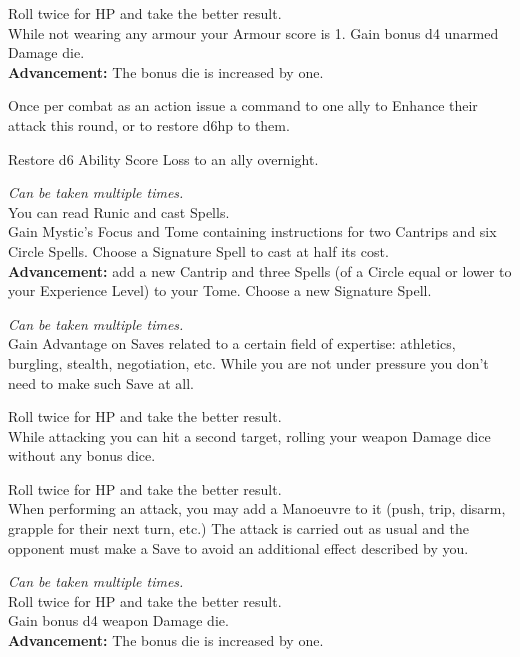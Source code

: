\documentclass[itdr]{subfiles}
\begin{document}
 Roll twice for HP and take the better result.\\
While not wearing any armour your Armour score is 1. Gain bonus d4 unarmed Damage die.\\
\textbf{Advancement:} The bonus die is increased by one.

Once per combat as an action issue a command to one ally to Enhance their attack this round, or to restore d6hp to them.

Restore d6 Ability Score Loss to an ally overnight.

 {\slshape Can be taken multiple times.}\\
You can read Runic and cast Spells.\\
Gain Mystic's Focus and Tome containing instructions for two Cantrips and six  Circle Spells. Choose a Signature Spell to cast at half its cost.\\
\textbf{Advancement:} add a new Cantrip and three Spells (of a Circle equal or lower to your Experience Level) to your Tome. Choose a new Signature Spell.

 {\slshape Can be taken multiple times.}\\
Gain Advantage on Saves related to a certain field of expertise: athletics, burgling, stealth, negotiation, etc. While you are not under pressure you don't need to make such Save at all.

 Roll twice for HP and take the better result.\\
While attacking you can hit a second target, rolling your weapon Damage dice without any bonus dice.

 Roll twice for HP and take the better result.\\
When performing an attack, you may add a Manoeuvre to it (push, trip, disarm, grapple for their next turn, etc.) The attack is carried out as usual and the opponent must make a Save to avoid an additional effect described by you.

 {\slshape Can be taken multiple times.}\\
Roll twice for HP and take the better result.\\
Gain bonus d4 weapon Damage die.\\
\textbf{Advancement:} The bonus die is increased by one.


\vfill
\break
\end{document}
